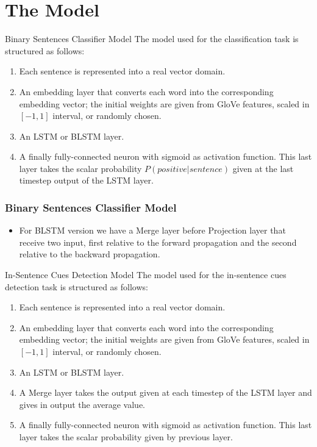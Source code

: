 \documentclass{beamer}
\begin{document}
\section{The Model}
\begin{frame}{Binary Sentences Classifier Model}
	The model used for the classification task is structured as follows:
	\begin{enumerate}\setlength\itemsep{1em}
		\item Each sentence is represented into a real vector domain.
		\item An embedding layer that converts each word into the corresponding embedding vector; the initial weights are given from GloVe features, scaled in $[-1,1]$ interval, or randomly chosen.
		\item An LSTM or BLSTM layer.
		\item A finally fully-connected neuron with sigmoid as activation function. This last layer takes the scalar probability $P(positive|sentence)$ given at the last timestep output of the LSTM layer.
	\end{enumerate}
\end{frame}
\begin{frame}[shrink=25]
	\frametitle{Binary Sentences Classifier Model}
	\vspace{30px}
	\begin{figure}[htbp]
		
	\end{figure}
	\begin{itemize}
		\item For BLSTM version we have a Merge layer before Projection layer that receive two input, first relative to the forward propagation and the second relative to the backward propagation.
	\end{itemize}
\end{frame}
\begin{frame}{In-Sentence Cues Detection Model}
	The model used for the in-sentence cues detection task is structured as follows:
	\begin{enumerate}\setlength\itemsep{1em}
		\item Each sentence is represented into a real vector domain.
		\item An embedding layer that converts each word into the corresponding embedding vector; the initial weights are given from GloVe features, scaled in $[-1,1]$ interval, or randomly chosen.
		\item An LSTM or BLSTM layer.
		\item A Merge layer takes the output given at each timestep of the LSTM layer and gives in output the average value.
		\item A finally fully-connected neuron with sigmoid as activation function. This last layer takes the scalar probability given by previous layer.
	\end{enumerate}
\end{frame}
\end{document}
